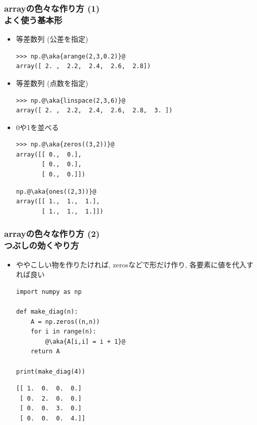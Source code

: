 \documentclass[10pt,dvipdfmx]{beamer}
\newcommand{\aka}[1]{{\color{red}#1}}
\begin{document}
\begin{frame}[fragile]
\frametitle{arrayの色々な作り方 (1) \\
よく使う基本形}

\begin{itemize}
\item 等差数列 (公差を指定)
\begin{lstlisting}
>>> np.@\aka{arange(2,3,0.2)}@
array([ 2. ,  2.2,  2.4,  2.6,  2.8])
\end{lstlisting}

\item 等差数列 (点数を指定)
\begin{lstlisting}
>>> np.@\aka{linspace(2,3,6)}@
array([ 2. ,  2.2,  2.4,  2.6,  2.8,  3. ])
\end{lstlisting}

\item 0や1を並べる
\begin{lstlisting}
>>> np.@\aka{zeros((3,2))}@
array([[ 0.,  0.],
       [ 0.,  0.],
       [ 0.,  0.]])
\end{lstlisting}
\begin{lstlisting}
np.@\aka{ones((2,3))}@
array([[ 1.,  1.,  1.],
       [ 1.,  1.,  1.]])
\end{lstlisting}
\end{itemize}
\end{frame}

\begin{frame}[fragile]
\frametitle{arrayの色々な作り方 (2) \\
つぶしの効くやり方}
\begin{itemize}
\item ややこしい物を作りたければ,
zerosなどで形だけ作り, 各要素に値を代入すれば良い

\begin{lstlisting}
import numpy as np

def make_diag(n):
    A = np.zeros((n,n))
    for i in range(n):
        @\aka{A[i,i] = i + 1}@
    return A

print(make_diag(4))
\end{lstlisting}

\begin{lstlisting}
[[ 1.  0.  0.  0.]
 [ 0.  2.  0.  0.]
 [ 0.  0.  3.  0.]
 [ 0.  0.  0.  4.]]
\end{lstlisting}
\end{itemize}
\end{frame}
\end{document}
